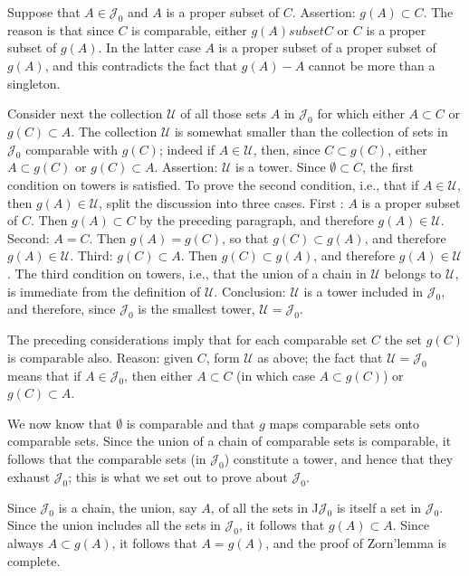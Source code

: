 Suppose that $A \in \mathcal{J}_{0}$ and $A$ is a proper subset of $C$. Assertion: $g(A) \subset C$. The reason is that since $C$ is comparable, either $g(A) subset C$ or $C$ is a proper subset of $g(A)$. In the latter case $A$ is a proper subset of a proper subset of $g(A)$, and this contradicts the fact that $g(A) - A$ cannot be more than a singleton. 

Consider next the collection $\mathcal{U}$ of all those sets $A$ in $\mathcal{J}_{0}$ for which either $A \subset C$ or $g(C) \subset A$. The collection $\mathcal{U}$ is somewhat smaller than the collection of sets in $\mathcal{J}_{0}$ comparable with $g(C)$; indeed if $A \in \mathcal{U}$, then, since $C \subset g(C)$, either $A \subset g(C)$ or $g(C) \subset A$. Assertion: $\mathcal{U}$ is a tower. Since $\emptyset \subset C$, the first condition on towers is satisfied. To prove the second condition, i.e., that if $A \in \mathcal{U}$, then $g(A) \in \mathcal {U}$, split the discussion into three cases. First : $A$ is a proper subset of $C$. Then $g(A) \subset C$ by the preceding paragraph, and therefore $g(A) \in \mathcal{U}$. Second: $A = C$. Then $g(A) = g(C)$, so that $g(C) \subset g(A)$, and therefore $g(A) \in \mathcal{U}$. Third: $g(C) \subset A$. Then $g(C) \subset g(A)$, and therefore $g(A) \in \mathcal{U}$. The third condition on towers, i.e., that the union of a chain in $\mathcal{U}$ belongs to $\mathcal{U}$, is immediate from the definition of $\mathcal{U}$. Conclusion: $\mathcal{U}$ is a tower included in $\mathcal{J}_{0}$, and therefore, since $\mathcal{J}_{0}$ is the smallest tower, $\mathcal{U} = \mathcal{J}_{0}$. 

The preceding considerations imply that for each comparable set $C$ the set $g(C)$ is comparable also. Reason: given $C$, form $\mathcal{U}$ as above; the fact that $\mathcal{U} = \mathcal{J}_{0}$ means that if $A \in \mathcal{J}_{0}$, then either $A \subset C$ (in which case $A \subset g(C)$) or $g(C) \subset A$.

We now know that $\emptyset$ is comparable and that $g$ maps comparable sets onto comparable sets. Since the union of a chain of comparable sets is comparable, it follows that the comparable sets (in $\mathcal{J}_{0}$) constitute a tower, and hence that they exhaust $\mathcal{J}_{0}$; this is what we set out to prove about $\mathcal{J}_{0}$. 

Since $\mathcal{J}_{0}$ is a chain, the union, say $A$, of all the sets in J$\mathcal{J}_{0}$ is itself a set in $\mathcal{J}_{0}$. Since the union includes all the sets in $\mathcal{J}_{0}$, it follows that $g(A) \subset A$. Since always $A \subset g(A)$, it follows that $A = g(A)$, and the proof of Zorn'lemma is complete.

